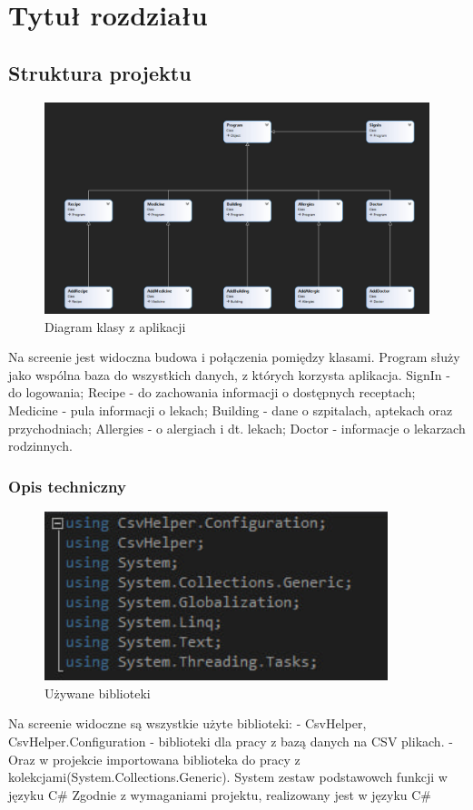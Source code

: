 ﻿%
\chapter{Tytuł rozdziału}


\section{Struktura projektu}
\begin{figure}[!ht]
	\centering
		\includegraphics[width=16cm]{diagram.jpg}
	\caption{\footnotesize Diagram klasy z aplikacji}
	\label{fig:plotend}
\end{figure}
Na screenie jest widoczna budowa i połączenia pomiędzy klasami. Program służy jako wspólna baza do wszystkich danych, z których korzysta aplikacja. SignIn - do logowania; Recipe - do zachowania informacji o dostępnych receptach; Medicine - pula informacji o lekach; Building - dane o szpitalach, aptekach oraz przychodniach; Allergies - o alergiach i dt. lekach; Doctor - informacje o lekarzach rodzinnych.

\newpage
\subsection{Opis techniczny}
\begin{figure}[!ht]
	\centering
		\includegraphics[width=10cm]{labs.jpg}
	\caption{\footnotesize Używane biblioteki}
	\label{fig:plotend}
\end{figure}
Na screenie widoczne są wszystkie użyte biblioteki: - CsvHelper, CsvHelper.Configuration - biblioteki dla pracy z bazą danych na CSV plikach. - Oraz w projekcie importowana biblioteka do pracy z kolekcjami(System.Collections.Generic). System zestaw podstawowch funkcji w języku C#
Zgodnie z wymaganiami projektu, realizowany jest w języku C#
